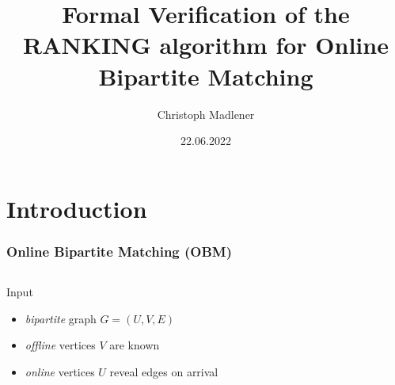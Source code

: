 \documentclass{beamer}
\title{Formal Verification of the RANKING algorithm for Online Bipartite Matching}
\author{Christoph Madlener}
\date{22.06.2022}
\begin{document}
\begin{frame}[plain]
  \titlepage
\end{frame}

\section{Introduction}
\begin{frame}
  \frametitle{Online Bipartite Matching (OBM)}
  \begin{columns}
    \begin{column}{.65\textwidth}
      \begin{exampleblock}{Input}
        \begin{itemize}[<+->]
          \item \emph{bipartite} graph $G = (U,V,E)$
          \item \emph{offline} vertices $V$ are known
          \item \emph{online} vertices $U$ reveal edges on arrival
        \end{itemize}
      \end{exampleblock}
    \end{column}
    \begin{column}{.3\textwidth}

\end{column}
\end{columns}
\end{frame}
\end{document}
